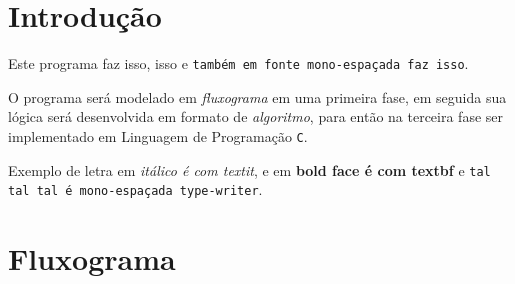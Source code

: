\documentclass[a4paper,12pt]{article} %
\begin{document}
\section{Introdução}


Este programa faz isso, isso e \texttt{também em fonte mono-espaçada faz isso}.

O programa será modelado em \textit{fluxograma} em uma primeira fase, em seguida
sua lógica será desenvolvida em formato de \textit{algoritmo}, para então
na terceira fase ser implementado em Linguagem de Programação \texttt{C}.

Exemplo de letra em \textit{itálico é com textit}, e em \textbf{bold face é com textbf} e \texttt{tal tal tal é mono-espaçada type-writer}.

\section{Fluxograma}

\end{document}
